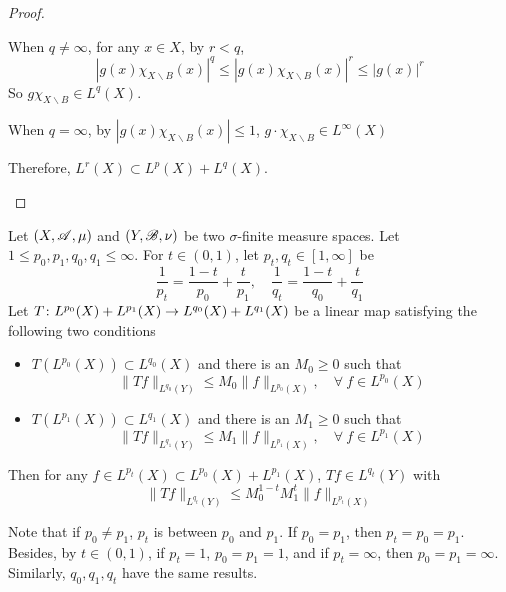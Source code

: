 \begin{proof}
\begin{enumerate}[label=(\arabic{*})]
\begin{itemize}
			\noindent When $q \neq \infty$, for any $x \in X$, by $r < q$,
			\begin{equation*}
				\left|g(x) \chi_{X \backslash B}(x)\right|^q \leq\left|g(x) \chi_{X \backslash B}(x)\right|^r \leq|g(x)|^r
			\end{equation*}
			So $g \chi_{X \backslash B} \in L^q(X)$.

			\noindent When $q = \infty$, by $\left|g(x) \chi_{X \backslash B}(x)\right| \leq 1$, $g \cdot \chi_{X \backslash B} \in L^\infty(X)$
		\end{itemize}
		Therefore, $L^r(X) \subset L^p(X) + L^q(X)$.
	\end{enumerate}
\end{proof}

\begin{thm}\label{thm:rieszthorin}
	Let $(X,\mathscr{A},\mu)$ and $(Y,\mathscr{B},\nu)$ be two $\sigma$-finite measure spaces. Let $1 \leq p_0,p_1,q_0,q_1 \leq \infty$. For $t \in (0,1)$, let $p_t,q_t \in [1,\infty]$ be
	\begin{equation*}
		\frac{1}{p_t}=\frac{1-t}{p_0}+\frac{t}{p_1}, \quad \frac{1}{q_t}=\frac{1-t}{q_0}+\frac{t}{q_1}
	\end{equation*}
	Let $T \colon L^{p_0}(X) + L^{p_1}(X) \rightarrow L^{q_0}(X) + L^{q_1}(X)$ be a linear map satisfying the following two conditions
	\begin{itemize}
		\item $T(L^{p_0}(X)) \subset L^{q_0}(X)$ and there is an $M_0 \geq 0$ such that
		\begin{equation*}
			\|T f\|_{L^{q_0}(Y)} \leq M_0\|f\|_{L^{p_0}(X)},\quad \forall~f \in L^{p_0}(X)
		\end{equation*}
		\item $T(L^{p_1}(X)) \subset L^{q_1}(X)$ and there is an $M_1 \geq 0$ such that
		\begin{equation*}
			\|T f\|_{L^{q_1}(Y)} \leq M_1\|f\|_{L^{p_1}(X)},\quad \forall~f \in L^{p_1}(X)
		\end{equation*}
	\end{itemize}
	Then for any $f \in L^{p_t}(X) \subset L^{p_0}(X) + L^{p_1}(X)$, $Tf \in L^{q_t}(Y)$ with
	\begin{equation*}
		\|T f\|_{L^{q_t}(Y)} \leq M_0^{1-t} M_1^t\|f\|_{L^{p_t}(X)}
	\end{equation*}
\end{thm}
\begin{rmk}
	Note that if $p_0 \neq p_1$, $p_t$ is between $p_0$ and $p_1$. If $p_0 = p_1$, then $p_t = p_0 = p_1$. Besides,  by $t \in (0,1)$, if $p_t = 1$, $p_0 = p_1 = 1$, and if $p_t = \infty$, then $p_0 = p_1 = \infty$. Similarly, $q_0,q_1,q_t$ have the same results.
\end{rmk}
